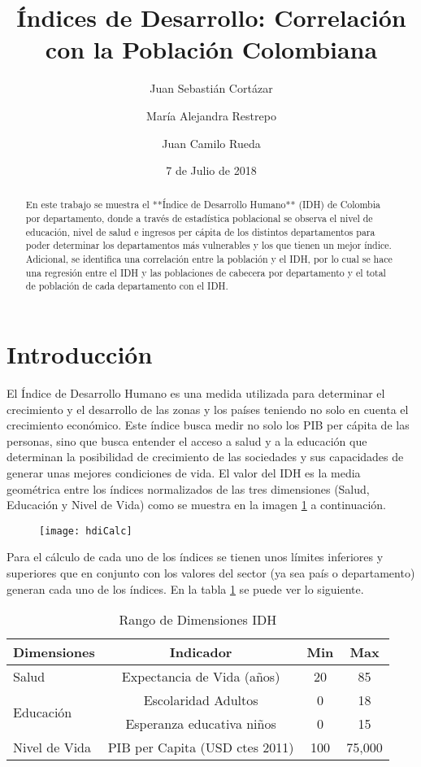 \documentclass{article}
\title{Índices de Desarrollo: Correlación con la Población Colombiana}
\author[1]{\normalsize Juan Sebastián Cortázar}
\author[2]{\normalsize María Alejandra Restrepo}
\author[3]{\normalsize Juan Camilo Rueda}
\affil[1,2,3]{\small  Universidad de los Andes\\
\texttt{{js.cortazar533,ma.restrepot,jc.rueda169}@uniandes.edu.col}}
\date{7 de Julio de 2018}
\begin{document}


\maketitle


\begin{abstract}

En este trabajo se muestra el **Índice de Desarrollo Humano** (IDH) de Colombia por departamento, donde a través de estadística poblacional se observa el nivel de educación, nivel de salud e ingresos per cápita de los distintos departamentos para poder determinar los departamentos más vulnerables y los que tienen un mejor índice. Adicional, se identifica una correlación entre la población y el IDH, por lo cual se hace una regresión entre el IDH y las poblaciones de cabecera por departamento y el total de población de cada departamento con el IDH.

\end{abstract}

\section*{Introducción}

El Índice de Desarrollo Humano es una medida utilizada para determinar el crecimiento y el desarrollo de las zonas y los países teniendo no solo en cuenta el crecimiento económico. Este índice busca medir no solo los PIB per cápita de las personas, sino que busca entender el acceso a salud y a la educación que determinan la posibilidad de crecimiento de las sociedades y sus capacidades de generar unas mejores condiciones de vida. 
El valor del IDH es la media geométrica entre los índices normalizados de las tres dimensiones (Salud, Educación y Nivel de Vida) como se muestra en la imagen \ref{IDH} a continuación. 


\begin{figure}[h]
\centering
\texttt{[image: hdiCalc]}
\label {IDH}
\end{figure}

Para el cálculo de cada uno de los índices se tienen unos límites inferiores y superiores que en conjunto con los valores del sector (ya sea país o departamento) generan cada uno de los índices. En la tabla \ref{Tabla 1:} se puede ver lo siguiente.


\begin{table}[h!]
\centering
  \begin{tabular}{l c c c}
  \hline
  Dimensiones & Indicador & Min & Max \\ [0.25ex]
  \hline \hline
  Salud & Expectancia de Vida (años) & 20 & 85 \\
  \multirow{2}{*}{Educación} & Escolaridad Adultos & 0 & 18 \\ 
   & Esperanza educativa niños & 0 & 15 \\
  Nivel de Vida  & PIB per Capita (USD ctes 2011) & 100 & 75,000 \\
  \hline
  \end{tabular}
 \caption {Rango de Dimensiones IDH}
  \label{Tabla 1:}
\end {table} 
\end{document}
